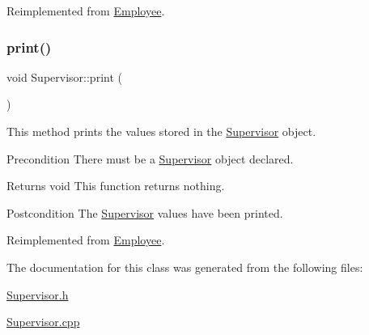 Reimplemented from \hyperlink{classEmployee_a01c2c44e15434237db28832f6972e960}{Employee}.

\mbox{\label{classSupervisor_a92483dc9a54904d79b46c6ec4efb3f54}} 
\subsubsection{\texorpdfstring{print()}{print()}}
{\footnotesize\ttfamily void Supervisor\+::print (\begin{DoxyParamCaption}{ }\end{DoxyParamCaption})\hspace{0.3cm}{\ttfamily [virtual]}}

This method prints the values stored in the \hyperlink{classSupervisor}{Supervisor} object.

\begin{DoxyPrecond}{Precondition}
There must be a \hyperlink{classSupervisor}{Supervisor} object declared. 
\end{DoxyPrecond}
\begin{DoxyReturn}{Returns}
void This function returns nothing. 
\end{DoxyReturn}
\begin{DoxyPostcond}{Postcondition}
The \hyperlink{classSupervisor}{Supervisor} values have been printed. 
\end{DoxyPostcond}


Reimplemented from \hyperlink{classEmployee_a79556ad700627dba88049f487a34a762}{Employee}.



The documentation for this class was generated from the following files\+:\begin{DoxyCompactItemize}
\item 
\hyperlink{Supervisor_8h}{Supervisor.\+h}\item 
\hyperlink{Supervisor_8cpp}{Supervisor.\+cpp}\end{DoxyCompactItemize}
